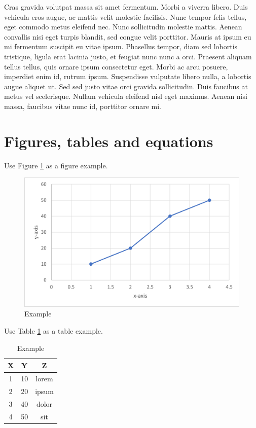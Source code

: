 \documentclass[12pt]{article}
\begin{document}
Cras gravida volutpat massa sit amet fermentum. Morbi a viverra libero. Duis vehicula eros augue, ac mattis velit molestie facilisis. Nunc tempor felis tellus, eget commodo metus eleifend nec. Nunc sollicitudin molestie mattis. Aenean convallis nisi eget turpis blandit, sed congue velit porttitor. Mauris at ipsum eu mi fermentum suscipit eu vitae ipsum. Phasellus tempor, diam sed lobortis tristique, ligula erat lacinia justo, et feugiat nunc nunc a orci. Praesent aliquam tellus tellus, quis ornare ipsum consectetur eget. Morbi ac arcu posuere, imperdiet enim id, rutrum ipsum. Suspendisse vulputate libero nulla, a lobortis augue aliquet ut. Sed sed justo vitae orci gravida sollicitudin. Duis faucibus at metus vel scelerisque. Nullam vehicula eleifend nisl eget maximus. Aenean nisi massa, faucibus vitae nunc id, porttitor ornare mi.

\section{Figures, tables and equations}

Use Figure \ref{fig:example} as a figure example.

\begin{figure}[h!]
\centering
\includegraphics{img/figure.png}
\caption{Example}
\label{fig:example}
\end{figure}

Use Table \ref{tab:example} as a table example.
\begin{table}[h!]
\centering
\caption{Example}
\label{tab:example}
\begin{tabular}{c c c}
 \hline
 \textbf{X} & \textbf{Y}  & \textbf{Z}\\
 \hline
 1 & 10 & lorem \\
 2 & 20 & ipsum \\
 3 & 40 & dolor \\
 4 & 50 & sit   \\
 \hline
\end{tabular}
\end{table}
\end{document}
